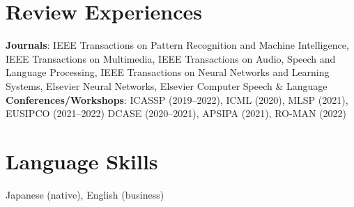 \documentclass[letterpaper,11pt]{article}
\begin{document}
\section{Review Experiences}
 \begin{itemize}[leftmargin=0.15in, label={}]
    \small{\item{
     \textbf{Journals}{: IEEE Transactions on Pattern Recognition and Machine Intelligence, IEEE Transactions on Multimedia, IEEE Transactions on Audio, Speech and Language Processing, IEEE Transactions on Neural Networks and Learning Systems, Elsevier Neural Networks, Elsevier Computer Speech \& Language} \\
     \textbf{Conferences/Workshops}{: ICASSP (2019--2022), ICML (2020), MLSP (2021), EUSIPCO (2021--2022) DCASE (2020--2021), APSIPA (2021), RO-MAN (2022)}
    }}
 \end{itemize}
%

\section{Language Skills}
 \begin{itemize}[leftmargin=0.15in, label={}]
    \small{\item{Japanese (native), English (business)}}
 \end{itemize}

\end{document}
